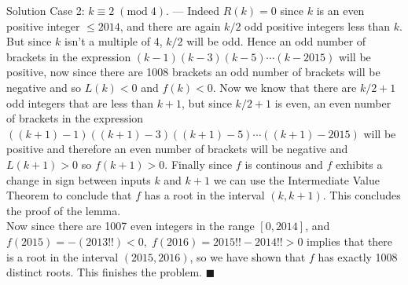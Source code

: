 \documentclass{article}
\begin{document}
\begin{solution}{Solution}
Case 2: $k \equiv 2 \; (\text{mod} \; 4)$. --- Indeed $R(k) = 0$ since
$k$ is an even positive integer $\leq 2014$, and there
are again $k/2$ odd positive integers less than $k$. But since $k$ isn't a
multiple of 4, $k/2$ will be odd. Hence an odd number of brackets in the
expression $(k-1)(k-3)(k-5) \cdots (k-2015)$ will be positive, now since
there are 1008 brackets an odd number of brackets will be negative and so
$L(k) < 0$ and $f(k) < 0$. Now we know that there are $k/2 + 1$ odd
integers that are
less than $k+1$, but since $k/2 + 1$ is even, an even number of brackets
in the expression $((k+1)-1)((k+1)-3)((k+1)-5) \cdots ((k+1)-2015)$ will
be positive and therefore an even number of brackets will be negative and
$L(k+1) > 0$ so $f(k+1) > 0$.
Finally since $f$ is
continous and $f$ exhibits a change in sign between inputs $k$ and $k + 1$
we can use the Intermediate Value Theorem to conclude that $f$ has a root
in the interval $(k, k+1)$. This concludes the proof of the lemma.\\

Now since there are 1007 even integers in the range $[0, 2014]$, and
$f(2015) = -(2013!!) < 0, \; f(2016) = 2015!! - 2014!! > 0$ implies that
there is a root in the interval $(2015, 2016)$, so we have shown that $f$
has exactly 1008 distinct roots. This finishes the problem. $\blacksquare$

\end{solution}
\end{document}
